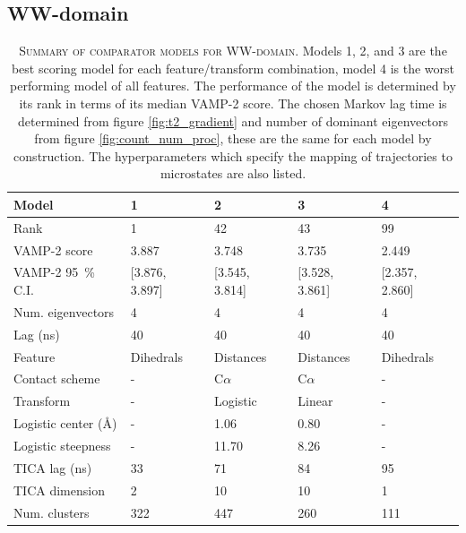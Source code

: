 \documentclass{article}
\begin{document}
\clearpage
\subsection{WW-domain}

\begin{table}[h]
    \centering
    \begin{tabular}{lllll}
    \toprule
    Model &               1 &               2 &               3 &               4 \\
    \midrule
    Rank                             &               1 &              42 &              43 &              99 \\
    VAMP-2 score                     &           3.887 &           3.748 &           3.735 &           2.449 \\
    VAMP-2 \SI{95}{\percent} C.I.    &  [3.876, 3.897] &  [3.545, 3.814] &  [3.528, 3.861] &  [2.357, 2.860] \\
    Num. eigenvectors                &               4 &               4 &               4 &               4 \\
    Lag (ns)                         &              40 &              40 &              40 &              40 \\
    Feature                          &       Dihedrals &       Distances &       Distances &       Dihedrals \\
    Contact scheme                   &               - &       C$\alpha$ &       C$\alpha$ &               - \\
    Transform                        &               - &        Logistic &          Linear &               - \\
    Logistic center (\si{\angstrom}) &               - &            1.06 &            0.80 &               - \\
    Logistic steepness               &               - &           11.70 &            8.26 &               - \\
    TICA lag (ns)                    &              33 &              71 &              84 &              95 \\
    TICA dimension                   &               2 &              10 &              10 &               1 \\
    Num. clusters                    &             322 &             447 &             260 &             111 \\
    \bottomrule
    \end{tabular}
    \caption{\textsc{Summary of comparator models for WW-domain.} Models 1, 2, and 3 are the best scoring model for each feature/transform combination, model 4 is the worst performing model of all features.  The performance of the model is determined by its rank in terms of its median VAMP-2 score.  The chosen Markov lag time is determined from figure \ref{fig:t2_gradient} and number of dominant eigenvectors from figure \ref{fig:count_num_proc}, these are the same for each model by construction. The hyperparameters which specify the mapping of trajectories to microstates are also listed.}
    \label{tab:gtt_mod_defs}
\end{table}
\end{document}
